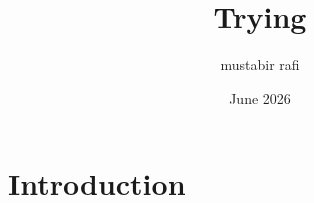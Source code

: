 \documentclass{article}
\title{Trying}
\author{mustabir rafi}
\date{June 2026}
\begin{document}
\maketitle

\section{Introduction}
\end{document}
